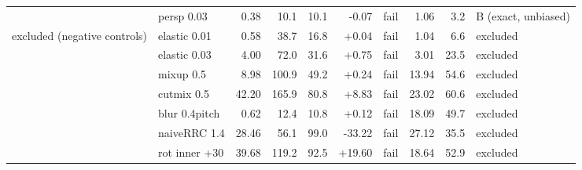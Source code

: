 \begin{tabular}{llrrrrlrrl}
 & persp 0.03 & 0.38 & 10.1 & 10.1 & -0.07 & fail & 1.06 & 3.2 & B (exact, unbiased) \\
excluded (negative controls) & elastic 0.01 & 0.58 & 38.7 & 16.8 & +0.04 & fail & 1.04 & 6.6 & excluded \\
 & elastic 0.03 & 4.00 & 72.0 & 31.6 & +0.75 & fail & 3.01 & 23.5 & excluded \\
 & mixup 0.5 & 8.98 & 100.9 & 49.2 & +0.24 & fail & 13.94 & 54.6 & excluded \\
 & cutmix 0.5 & 42.20 & 165.9 & 80.8 & +8.83 & fail & 23.02 & 60.6 & excluded \\
 & blur 0.4pitch & 0.62 & 12.4 & 10.8 & +0.12 & fail & 18.09 & 49.7 & excluded \\
 & naiveRRC 1.4 & 28.46 & 56.1 & 99.0 & -33.22 & fail & 27.12 & 35.5 & excluded \\
 & rot inner +30 & 39.68 & 119.2 & 92.5 & +19.60 & fail & 18.64 & 52.9 & excluded \\
\bottomrule
\end{tabular}
